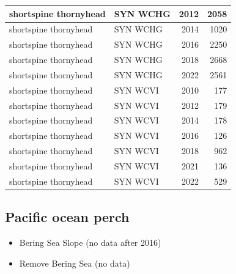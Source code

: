 \documentclass[
  letterpaper,
  DIV=11,
  numbers=noendperiod]{scrartcl}
\providecommand{\tightlist}{%
  \setlength{\itemsep}{0pt}\setlength{\parskip}{0pt}}\usepackage{longtable,booktabs,array}
\begin{document}
\begin{tabular}[t]{l|l|r|r}
\hline
shortspine thornyhead & SYN WCHG & 2012 & 2058\\
\hline
shortspine thornyhead & SYN WCHG & 2014 & 1020\\
\hline
shortspine thornyhead & SYN WCHG & 2016 & 2250\\
\hline
shortspine thornyhead & SYN WCHG & 2018 & 2668\\
\hline
shortspine thornyhead & SYN WCHG & 2022 & 2561\\
\hline
shortspine thornyhead & SYN WCVI & 2010 & 177\\
\hline
shortspine thornyhead & SYN WCVI & 2012 & 179\\
\hline
shortspine thornyhead & SYN WCVI & 2014 & 178\\
\hline
shortspine thornyhead & SYN WCVI & 2016 & 126\\
\hline
shortspine thornyhead & SYN WCVI & 2018 & 962\\
\hline
shortspine thornyhead & SYN WCVI & 2021 & 136\\
\hline
shortspine thornyhead & SYN WCVI & 2022 & 529\\
\hline
\end{tabular}

\subsection{Pacific ocean perch}\label{pacific-ocean-perch}

\begin{itemize}
\tightlist
\item
  Bering Sea Slope (no data after 2016)
\item
  Remove Bering Sea (no data)
\end{itemize}
\end{document}
